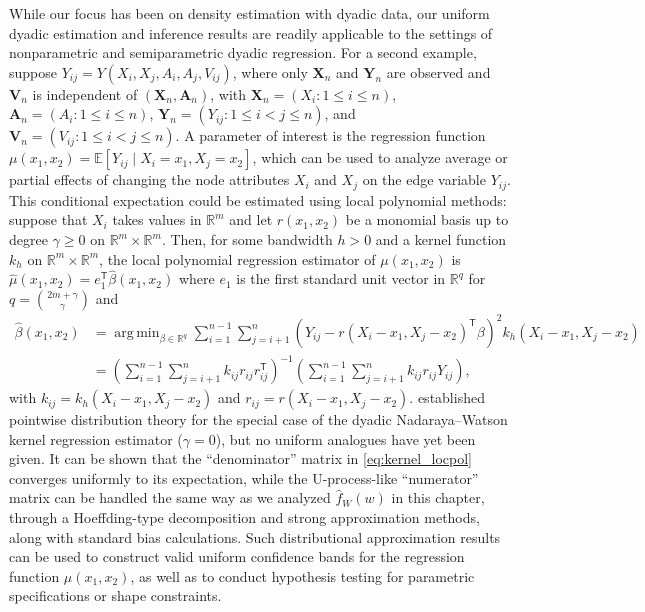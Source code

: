 \documentclass[11pt,lof]{puthesis}
\newcommand{\R}{\ensuremath{\mathbb{R}}}
\newcommand{\E}{\ensuremath{\mathbb{E}}}
\newcommand{\bY}{\ensuremath{\mathbf{Y}}}
\newcommand{\bX}{\ensuremath{\mathbf{X}}}
\newcommand{\bA}{\ensuremath{\mathbf{A}}}
\newcommand{\bV}{\ensuremath{\mathbf{V}}}
\newcommand{\T}{\ensuremath{\mathsf{T}}}
\DeclareMathOperator*{\argmin}{arg\,min}
\theoremstyle{break}
\theoremstyle{proof}
\begin{document}
While our focus has been on density estimation with dyadic data,
our uniform dyadic estimation and inference results are readily applicable
to the settings of nonparametric and semiparametric dyadic regression.
For a second example, suppose $Y_{i j} = Y(X_i, X_j, A_i, A_j, V_{i j})$,
where only $\bX_n$ and $\bY_n$ are observed and
$\bV_n$ is independent of $(\bX_n, \bA_n)$,
with $\bX_n = (X_i : 1 \leq i \leq n)$,
$\bA_n = (A_i : 1 \leq i \leq n)$, $\bY_n = (Y_{i j}:1\leq i<j\leq n)$,
and $\bV_n = (V_{i j} : 1 \leq i < j \leq n)$.
A parameter of interest is the regression function
$\mu(x_1, x_2) = \E[Y_{i j} \mid X_i=x_1, X_j=x_2]$,
which can be used to analyze average or partial effects
of changing the node attributes $X_i$ and $X_j$ on the edge variable $Y_{i j}$.
This conditional expectation could be estimated using local polynomial methods:
suppose that $X_i$ takes values in $\R^m$ and
let $r(x_1, x_2)$ be a monomial basis up to degree
$\gamma \geq 0$ on $\R^m \times \R^m$. Then, for some bandwidth $h > 0$ and
a kernel function $k_h$ on $\R^m \times \R^m$,
the local polynomial regression estimator of $\mu(x_1, x_2)$ is
$\hat\mu(x_1, x_2) = e_1^\T \hat\beta(x_1, x_2)$ where
$e_1$ is the first standard unit vector in $\R^q$ for
$q=\binom{2m+\gamma}{\gamma}$ and
%
\begin{align}
\nonumber
\hat{\beta}(x_1, x_2)
&=
\argmin_{\beta \in \R^q}
\sum_{i=1}^{n-1} \sum_{j=i+1}^n
\left( Y_{i j} - r(X_i-x_1, X_j-x_2)^\T \beta \right)^2
k_h(X_i-x_1, X_j-x_2) \\
\label{eq:kernel_locpol}
&=
\left(
\sum_{i=1}^{n-1} \sum_{j=i+1}^n k_{i j} r_{i j} r_{i j}^\T
\right)^{-1}
\left(
\sum_{i=1}^{n-1} \sum_{j=i+1}^n k_{i j} r_{i j} Y_{i j}
\right),
\end{align}
%
with $k_{i j} = k_h(X_i-x_1, X_j-x_2)$ and $r_{i j} = r(X_i-x_1, X_j-x_2)$.
\citet{graham2021minimax} established pointwise distribution theory
for the special case of the dyadic Nadaraya--Watson kernel regression estimator
($\gamma=0$), but no uniform analogues have yet been given. It can be shown
that the ``denominator'' matrix in \eqref{eq:kernel_locpol} converges uniformly
to its
expectation, while the U-process-like ``numerator'' matrix can be handled the
same way as we analyzed $\hat f_W(w)$ in this chapter, through a Hoeffding-type
decomposition and strong approximation methods, along with standard bias
calculations. Such distributional approximation results can be used to
construct valid uniform confidence bands for the regression function
$\mu(x_1, x_2)$, as well as to conduct hypothesis testing for parametric
specifications or shape constraints.
\end{document}
